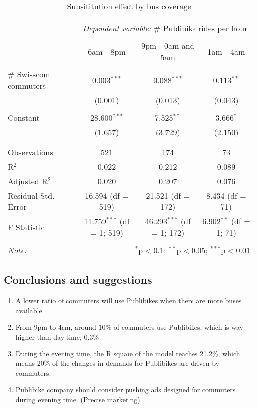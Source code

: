 \documentclass{article}
\begin{document}
\begin{table}[H] \centering 
  \caption{Subsititution effect by bus coverage} 
  \label{} 
\begin{tabular}{@{\extracolsep{5pt}}lccc} 
\\[-1.8ex]\hline 
\hline \\[-1.8ex] 
 & \multicolumn{3}{c}{\textit{Dependent variable:} \# Publibike rides per hour}\\ 
\cline{2-4} 
\\[-1.8ex] & 6am - 8pm & 9pm - 0am and 5am & 1am - 4am\\ 
\hline \\[-1.8ex] 
 \# Swisscom commuters & 0.003$^{***}$ & 0.088$^{***}$ & 0.113$^{**}$ \\ 
  & (0.001) & (0.013) & (0.043) \\ 
  & & & \\ 
 Constant & 28.600$^{***}$ & 7.525$^{**}$ & 3.666$^{*}$ \\ 
  & (1.657) & (3.729) & (2.150) \\ 
  & & & \\ 
\hline \\[-1.8ex] 
Observations & 521 & 174 & 73 \\ 
R$^{2}$ & 0.022 & 0.212 & 0.089 \\ 
Adjusted R$^{2}$ & 0.020 & 0.207 & 0.076 \\ 
Residual Std. Error & 16.594 (df = 519) & 21.521 (df = 172) & 8.434 (df = 71) \\ 
F Statistic & 11.759$^{***}$ (df = 1; 519) & 46.293$^{***}$ (df = 1; 172) & 6.902$^{**}$ (df = 1; 71) \\ 
\hline 
\hline \\[-1.8ex] 
\textit{Note:}  & \multicolumn{3}{r}{$^{*}$p$<$0.1; $^{**}$p$<$0.05; $^{***}$p$<$0.01} \\ 
\end{tabular} 
\end{table} 

\subsection{Conclusions and suggestions}
\begin{enumerate}
    \item A lower ratio of commuters will use Publibikes when there are more buses available
    \item From 9pm to 4am, around 10\% of commuters use Publibikes, which is way higher than day time, 0.3\%
    \item During the evening time, the R square of the model reaches 21.2\%, which means 20\% of the changes in demands for Publibikes are driven by commuters.
    \item Publibike company should consider pushing ads designed for commuters  during evening time. (Precise marketing)
\end{enumerate}
\end{document}
